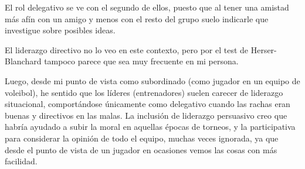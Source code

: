 El rol delegativo se ve con el segundo de ellos, puesto que al tener una amistad más afín con un amigo y menos con el resto del grupo suelo indicarle que investigue sobre posibles ideas.

El liderazgo directivo no lo veo en este contexto, pero por el test de Herser-Blanchard tampoco parece que sea muy frecuente en mi persona.

\vspace{\baselineskip}

Luego, desde mi punto de vista como subordinado (como jugador en un equipo de voleibol), he sentido que los líderes (entrenadores) suelen carecer de liderazgo situacional, comportándose únicamente como delegativo cuando las rachas eran buenas y directivos en las malas. La inclusión de liderazgo persuasivo creo que habría ayudado a subir la moral en aquellas épocas de torneos, y la participativa para considerar la opinión de todo el equipo, muchas veces ignorada, ya que desde el punto de vista de un jugador en ocasiones vemos las cosas con más facilidad.


